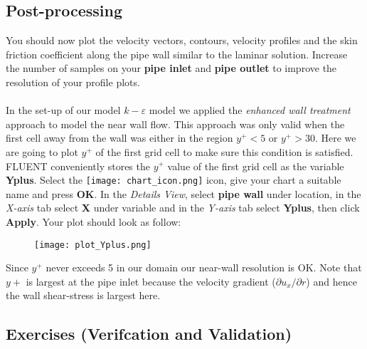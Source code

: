 \documentclass[11pt,a4paper,oneside]{scrartcl}
\newcommand\bfr[1]{\textcolor[rgb]{1,0.00,0.00}{\textbf{\textsf{#1}}}}
\begin{document}
\subsection{Post-processing}
You should now plot the velocity vectors, contours, velocity profiles and the skin friction coefficient along the pipe wall similar to the laminar solution. Increase the number of samples on your \bfr{pipe inlet} and \bfr{pipe outlet} to improve the resolution of your profile plots.
\\
\\
In the set-up of our model $k-\varepsilon$ model we applied the \emph{enhanced wall treatment} approach to model the near wall flow. This approach was only valid when the first cell away from the wall was either in the region $y^+<5$ or $y^+>30$. Here we are going to plot $y^+$ of the first grid cell to make sure this condition is satisfied. FLUENT conveniently stores the $y^+$ value of the first grid cell as the variable \bfr{Yplus}. Select the \texttt{[image: chart\_icon.png]} icon, give your chart a suitable name and press \bfr{OK}. In the \emph{Details View}, select \bfr{pipe wall} under location, in the \emph{X-axis} tab select \bfr{X} under variable and in the \emph{Y-axis} tab select \bfr{Yplus}, then click \bfr{Apply}. Your plot should look as follow:

\begin{figure}[H]
\begin{center}
\texttt{[image: plot\_Yplus.png]}
\end{center}
\end{figure}

Since $y^+$ never exceeds 5 in our domain our near-wall resolution is OK. Note that $y+$ is largest at the pipe inlet because the velocity gradient ($\partial u_{x}/\partial r$) and hence the wall shear-stress is largest here.

\subsection{Exercises (Verifcation and Validation)}
\end{document}
